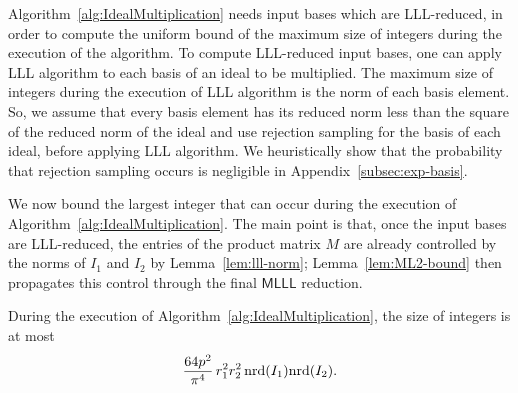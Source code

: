 \begin{remark}
Algorithm~\ref{alg:IdealMultiplication} needs input bases which are LLL-reduced, in order to compute the uniform bound of the maximum size of integers during the execution of the algorithm.
To compute LLL-reduced input bases, one can apply LLL algorithm to each basis of an ideal to be multiplied. The maximum size of integers during the execution of LLL algorithm is the norm of each basis element.
So, we assume that every basis element has its reduced norm less than the square of the reduced norm of the ideal and use rejection sampling for the basis of each ideal, before applying LLL algorithm.
We heuristically show that the probability that rejection sampling occurs is negligible in Appendix~\ref{subsec:exp-basis}.
\end{remark}

We now bound the largest integer that can occur during the execution of Algorithm~\ref{alg:IdealMultiplication}. The main point is that, once the input bases are LLL-reduced, the entries of the product matrix $M$ are already controlled by the norms of $I_1$ and $I_2$ by Lemma~\ref{lem:lll-norm}; Lemma~\ref{lem:ML2-bound} then propagates this control through the final $\mathsf{MLLL}$ reduction.

\begin{lemma}
\label{lem:idealmult-bound}
During the execution of Algorithm~\ref{alg:IdealMultiplication}, the size of integers is at most
\[ \frac{64p^2}{\pi^4}\, r_1^2r_2^2\,\mathrm{nrd}(I_1)\mathrm{nrd}(I_2). \]
\end{lemma}

